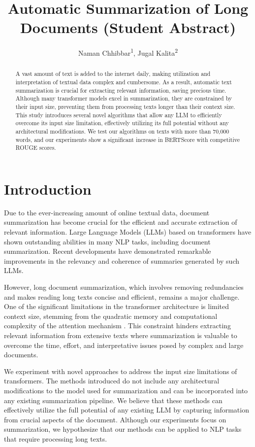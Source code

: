 \documentclass[letterpaper]{article} %
\title{Automatic Summarization of Long Documents (Student Abstract)}
\author{
  Naman Chhibbar\textsuperscript{\rm 1},
  Jugal Kalita\textsuperscript{\rm 2}
}
\begin{document}
\maketitle

\begin{abstract}
A vast amount of text is added to the internet daily, making utilization and interpretation of textual data complex and cumbersome.
As a result, automatic text summarization is crucial for extracting relevant information, saving precious time.
Although many transformer models excel in summarization, they are constrained by their input size, preventing them from processing texts longer than their context size.
This study introduces several novel algorithms that allow any LLM to efficiently overcome its input size limitation, effectively utilizing its full potential without any architectural modifications.
We test our algorithms on texts with more than 70,000 words, and our experiments show a significant increase in BERTScore with competitive ROUGE scores.
\end{abstract}


\section{Introduction}

Due to the ever-increasing amount of online textual data, document summarization has become crucial for the efficient and accurate extraction of relevant information.
Large Language Models (LLMs) based on transformers have shown outstanding abilities in many NLP tasks, including document summarization.
Recent developments have demonstrated remarkable improvements in the relevancy and coherence of summaries generated by such LLMs.

However, long document summarization, which involves removing redundancies and makes reading long texts concise and efficient, remains a major challenge.
One of the significant limitations in the transformer architecture is limited context size, stemming from the quadratic memory and computational complexity of the attention mechanism \cite{du2023improving}.
This constraint hinders extracting relevant information from extensive texts where summarization is valuable to overcome the time, effort, and interpretative issues posed by complex and large documents.

We experiment with novel approaches to address the input size limitations of transformers.
The methods introduced do not include any architectural modifications to the model used for summarization and can be incorporated into any existing summarization pipeline.
We believe that these methods can effectively utilize the full potential of any existing LLM by capturing information from crucial aspects of the document.
Although our experiments focus on summarization, we hypothesize that our methods can be applied to NLP tasks that require processing long texts.
\end{document}
